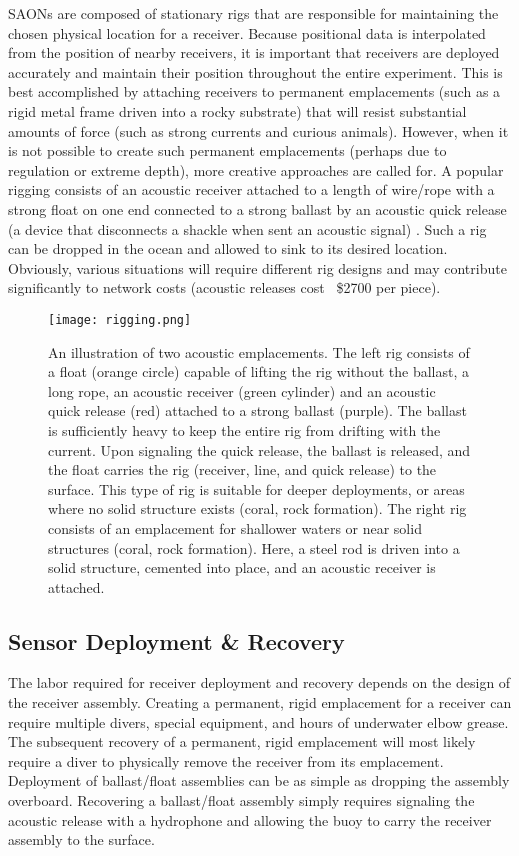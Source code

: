 SAONs are composed of stationary rigs that are responsible for maintaining the chosen physical location for a receiver.  Because positional data is interpolated from the position of nearby receivers, it is important that receivers are deployed accurately and maintain their position throughout the entire experiment\cite{Heupel2006}.  This is best accomplished by attaching receivers to permanent emplacements  (such as a rigid metal frame driven into a rocky substrate) that will resist substantial amounts of force (such as strong currents and curious animals).  However, when it is not possible to create such permanent emplacements (perhaps due to regulation or extreme depth), more creative approaches are called for.  A popular rigging consists of an acoustic receiver attached to a length of wire/rope with a strong float on one end connected to a strong ballast by an acoustic quick release (a device that disconnects a shackle when sent an acoustic signal) \cite{Heupel2006}.  Such a rig can be dropped in the ocean and allowed to sink to its desired location.  Obviously, various situations will require different rig designs and may contribute significantly to network costs (acoustic releases cost ~\$2700 per piece).


\begin{figure}[ht]
	\label{rigging}
	\centering
	\texttt{[image: rigging.png]}
	\caption{An illustration of two acoustic emplacements.  The left rig consists of a float (orange circle) capable of lifting the rig without the ballast, a long rope, an acoustic receiver (green cylinder) and an acoustic quick release (red) attached to a strong ballast (purple).  The ballast is sufficiently heavy to keep the entire rig from drifting with the current.  Upon signaling the quick release, the ballast is released, and the float carries the rig (receiver, line,  and quick release) to the surface.  This type of rig is suitable for deeper deployments, or areas where no solid structure exists (coral, rock formation).   The right rig consists of an emplacement for shallower waters or near solid structures (coral, rock formation).  Here, a steel rod is driven into a solid structure, cemented into place, and an acoustic receiver is attached. }
\end{figure}

\subsection{Sensor Deployment \& Recovery}
The labor required for receiver deployment and recovery depends on the design of the receiver assembly.  Creating a permanent, rigid emplacement for a receiver can require multiple divers, special equipment,  and hours of underwater elbow grease.  The subsequent recovery of a permanent, rigid emplacement will most likely require a diver to physically remove the receiver from its emplacement. Deployment of ballast/float assemblies can be as simple as dropping the assembly overboard.  Recovering a ballast/float assembly simply requires signaling the acoustic release with a hydrophone and allowing the buoy to carry the receiver assembly to the surface.

